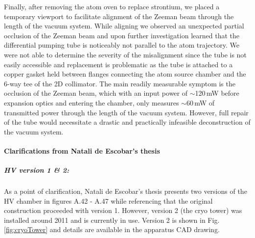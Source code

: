 Finally, after removing the atom oven to replace strontium, we placed a temporary viewport to facilitate alignment of the Zeeman beam through the length of the vacuum system. 
While aligning we observed an unexpected partial occlusion of the Zeeman beam and upon further investigation learned that the differential pumping tube is noticeably not parallel to the atom trajectory.
We were not able to determine the severity of the misalignment since the tube is not easily accessible and replacement is problematic as the tube is attached to a copper gasket held between flanges connecting the atom source chamber and the 6-way tee of the 2D collimator. 
The main readily measurable symptom is the occlusion of the Zeeman beam, which with an input power of $\sim$120\,mW before expansion optics and entering the chamber, only measures $\sim$60\,mW of transmitted power through the length of the vacuum system. 
However, full repair of the tube would necessitate a drastic and practically infeasible deconstruction of the vacuum system.

\paragraph{Clarifications from Natali de Escobar's thesis}
\subparagraph{HV version 1 \& 2:}
As a point of clarification, Natali de Escobar's thesis\cite{MartinezdeEscolar2010} presents two versions of the HV chamber in figures A.42 - A.47 while referencing that the original construction proceeded with version 1. 
However, version 2 (the cryo tower) was installed around 2011 and is currently in use. Version 2 is shown in Fig.\,\ref{fig:cryoTower} and details are available in the apparatus CAD drawing.

